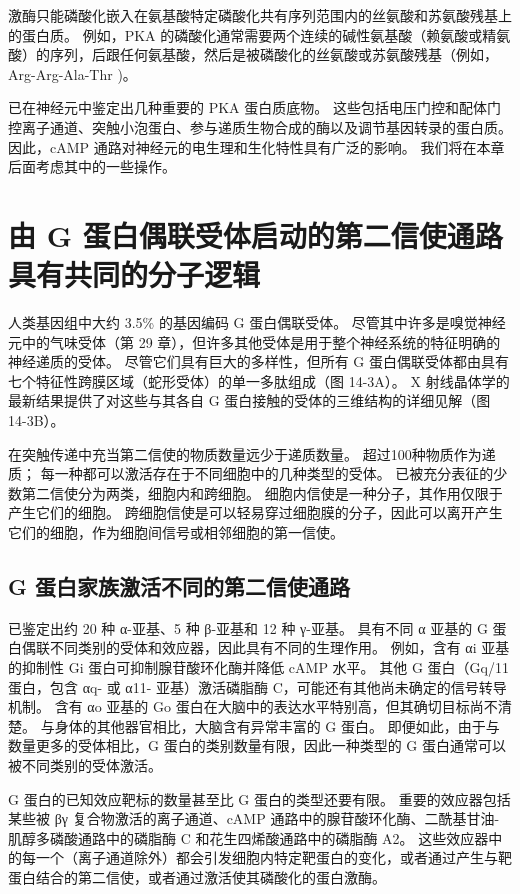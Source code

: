 激酶只能磷酸化嵌入在氨基酸特定磷酸化共有序列范围内的丝氨酸和苏氨酸残基上的蛋白质。 例如，PKA 的磷酸化通常需要两个连续的碱性氨基酸（赖氨酸或精氨酸）的序列，后跟任何氨基酸，然后是被磷酸化的丝氨酸或苏氨酸残基（例如，Arg-Arg-Ala-Thr )。

已在神经元中鉴定出几种重要的 PKA 蛋白质底物。 这些包括电压门控和配体门控离子通道、突触小泡蛋白、参与递质生物合成的酶以及调节基因转录的蛋白质。 因此，cAMP 通路对神经元的电生理和生化特性具有广泛的影响。 我们将在本章后面考虑其中的一些操作。


\section{由 G 蛋白偶联受体启动的第二信使通路具有共同的分子逻辑}

人类基因组中大约 3.5\% 的基因编码 G 蛋白偶联受体。 尽管其中许多是嗅觉神经元中的气味受体（第 29 章），但许多其他受体是用于整个神经系统的特征明确的神经递质的受体。 尽管它们具有巨大的多样性，但所有 G 蛋白偶联受体都由具有七个特征性跨膜区域（蛇形受体）的单一多肽组成（图 14-3A）。 X 射线晶体学的最新结果提供了对这些与其各自 G 蛋白接触的受体的三维结构的详细见解（图 14-3B）。

在突触传递中充当第二信使的物质数量远少于递质数量。 超过100种物质作为递质； 每一种都可以激活存在于不同细胞中的几种类型的受体。 已被充分表征的少数第二信使分为两类，细胞内和跨细胞。 细胞内信使是一种分子，其作用仅限于产生它们的细胞。 跨细胞信使是可以轻易穿过细胞膜的分子，因此可以离开产生它们的细胞，作为细胞间信号或相邻细胞的第一信使。

\subsection{G 蛋白家族激活不同的第二信使通路}
已鉴定出约 20 种 α-亚基、5 种 β-亚基和 12 种 γ-亚基。 具有不同 α 亚基的 G 蛋白偶联不同类别的受体和效应器，因此具有不同的生理作用。 例如，含有 αi 亚基的抑制性 Gi 蛋白可抑制腺苷酸环化酶并降低 cAMP 水平。 其他 G 蛋白（Gq/11 蛋白，包含 αq- 或 α11- 亚基）激活磷脂酶 C，可能还有其他尚未确定的信号转导机制。 含有 αo 亚基的 Go 蛋白在大脑中的表达水平特别高，但其确切目标尚不清楚。 与身体的其他器官相比，大脑含有异常丰富的 G 蛋白。 即便如此，由于与数量更多的受体相比，G 蛋白的类别数量有限，因此一种类型的 G 蛋白通常可以被不同类别的受体激活。

G 蛋白的已知效应靶标的数量甚至比 G 蛋白的类型还要有限。 重要的效应器包括某些被 βγ 复合物激活的离子通道、cAMP 通路中的腺苷酸环化酶、二酰基甘油-肌醇多磷酸通路中的磷脂酶 C 和花生四烯酸通路中的磷脂酶 A2。 这些效应器中的每一个（离子通道除外）都会引发细胞内特定靶蛋白的变化，或者通过产生与靶蛋白结合的第二信使，或者通过激活使其磷酸化的蛋白激酶。

